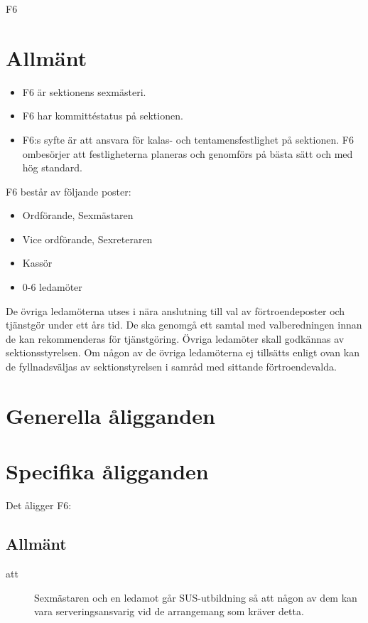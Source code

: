 \documentclass[a4paper]{article}
\begin{document}
\renewcommand{\forening}{F6} %

\begin{foreningenv}{\forening{}} %
    \section{Allmänt}
    \begin{itemize}
        \item F6 är sektionens sexmästeri. 
        \item F6 har kommittéstatus på sektionen.
        \item F6:s syfte är att ansvara för kalas- och tentamensfestlighet på sektionen. F6 ombesörjer att festligheterna planeras och genomförs på bästa sätt och med hög standard. 
    \end{itemize}
    F6 består av följande poster:
    \begin{itemize}
        \item Ordförande, Sexmästaren
        \item Vice ordförande, Sexreteraren
        \item Kassör
        \item 0-6 ledamöter
    \end{itemize}
    De övriga ledamöterna utses i nära anslutning till val av förtroendeposter och tjänstgör under ett års tid. De ska genomgå ett samtal med valberedningen innan de kan rekommenderas för tjänstgöring. Övriga ledamöter skall godkännas av sektionsstyrelsen. Om någon av de övriga ledamöterna ej tillsätts enligt ovan kan de fyllnadsväljas av sektionstyrelsen i samråd med sittande förtroendevalda.
    
    \section{Generella åligganden}
    \aliggkom{}
    
    \section{Specifika åligganden}
    Det åligger F6:
    
    \subsection{Allmänt}
    \begin{description}
        \item[att] Sexmästaren och en ledamot går SUS-utbildning så att någon av dem kan vara serveringsansvarig vid de arrangemang som kräver detta.
    \end{description}
    

\end{foreningenv}
\end{document}
